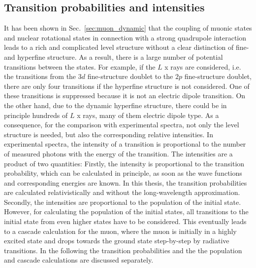 \subsection{Transition probabilities and intensities}
\label{sec:transitions}
It has been shown in Sec.~\ref{sec:muon_dynamic} that the coupling of muonic states and nuclear rotational states in connection with a strong quadrupole interaction leads to a rich and complicated level structure without a clear distinction of fine- and hyperfine structure. As a result, there is a large number of potential transitions between the states. For example, if the $L$ x rays are considered, i.e. the transitions from the $3d$ fine-structure doublet to the $2p$ fine-structure doublet, there are only four transitions if the hyperfine structure is not considered. One of these transitions is suppressed because it is not an electric dipole transition. On the other hand, due to the dynamic hyperfine structure, there could be in principle hundreds of $L$ x rays, many of them electric dipole type. As a consequence, for the comparison with experimental spectra, not only the level structure is needed, but also the corresponding relative intensities. In experimental spectra, the intensity of a transition is proportional to the number of measured photons with the energy of the transition. The intensities are a product of two quantities:
Firstly, the intensity is proportional to the transition probability, which can be calculated in principle, as soon as the wave functions and corresponding energies are known. In this thesis, the transition probabilities are calculated relativistically and without the long-wavelength approximation.
Secondly, the intensities are proportional to the population of the initial state. However, for calculating the population of the initial states, all transitions to the initial state from even higher states have to be considered. This eventually leads to a cascade calculation for the muon, where the muon is initially in a highly excited state and drops towards the ground state step-by-step by radiative transitions. In the following the transition probabilities and the the population and cascade calculations are discussed separately.\\

